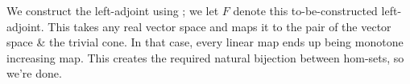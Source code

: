 %
%
\label {sol: forgetful functor from OrdVec to Vec has a left adjoint}We construct the left-adjoint using ; we let $F$ denote this to-be-constructed left-adjoint. This takes any real vector space and maps it to the pair of the vector space \& the trivial cone. In that case, every linear map ends up being monotone increasing map. This creates the required natural bijection between hom-sets, so we're done.
